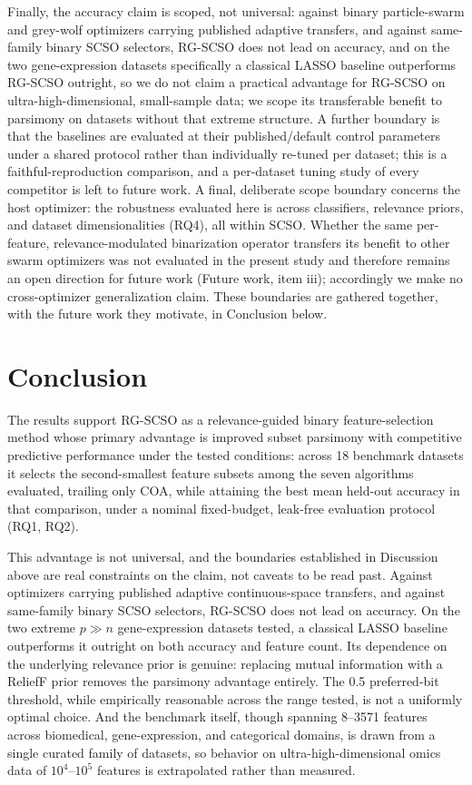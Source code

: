 \documentclass[preprint,3p,times]{elsarticle}
\begin{document}
Finally, the accuracy claim is scoped, not universal: against
binary particle-swarm and grey-wolf optimizers carrying published adaptive
transfers, and against same-family binary SCSO selectors, RG-SCSO does not
lead on accuracy, and on the two gene-expression datasets specifically a
classical LASSO baseline outperforms RG-SCSO outright, so we do
not claim a practical advantage for RG-SCSO on ultra-high-dimensional,
small-sample data; we scope its transferable benefit to parsimony on
datasets without that extreme structure. A further boundary is that the
baselines are evaluated at their published/default control parameters under a
shared protocol rather than individually re-tuned per dataset; this is a
faithful-reproduction comparison, and a per-dataset tuning study of every
competitor is left to future work. A final, deliberate scope boundary concerns
the host optimizer: the robustness evaluated here is across classifiers,
relevance priors, and dataset dimensionalities (RQ4), all within SCSO. Whether
the same per-feature, relevance-modulated binarization operator transfers its
benefit to other swarm optimizers was not evaluated in the present study and
therefore remains an open direction for future work (Future work, item iii);
accordingly we make no cross-optimizer generalization claim. These boundaries
are gathered together, with the future work they motivate, in Conclusion
below.

\FloatBarrier
\section{Conclusion}
The results support RG-SCSO as a relevance-guided binary
feature-selection method whose primary advantage is improved subset
parsimony with competitive predictive performance under the tested
conditions: across 18 benchmark datasets it selects the
second-smallest feature subsets among the seven algorithms evaluated, trailing only COA,
while attaining the best mean held-out accuracy in that comparison,
under a nominal fixed-budget, leak-free evaluation protocol
(RQ1, RQ2).

This advantage is not universal, and the boundaries established in
Discussion above are real constraints on the claim, not caveats to be
read past. Against optimizers carrying published adaptive continuous-space
transfers, and against same-family binary SCSO selectors, RG-SCSO does not
lead on accuracy. On the two extreme $p\gg n$ gene-expression datasets tested,
a classical LASSO baseline outperforms it outright on both accuracy and
feature count. Its dependence on the underlying relevance prior is genuine:
replacing mutual information with a ReliefF prior removes the parsimony
advantage entirely. The 0.5 preferred-bit threshold, while empirically
reasonable across the range tested, is not a uniformly optimal choice. And the
benchmark itself, though spanning 8--3571 features across
biomedical, gene-expression, and categorical domains, is drawn from a single
curated family of datasets, so behavior on ultra-high-dimensional omics data
of $10^4$--$10^5$ features is extrapolated rather than measured.
\end{document}
